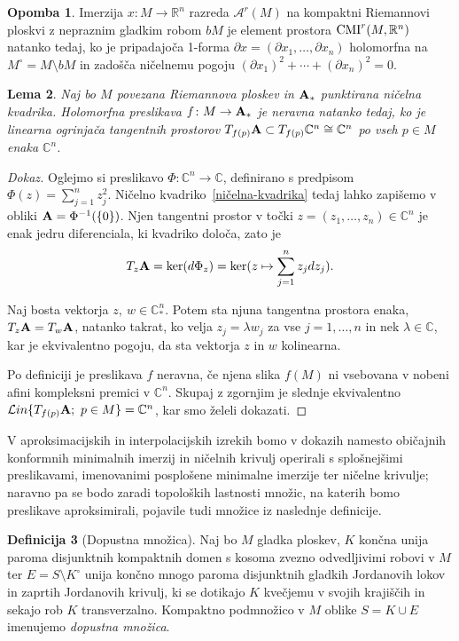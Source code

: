\documentclass[12pt,a4paper,twoside]{article}
\theoremstyle{definition} %
\newtheorem{definicija}{Definicija}[section]
\newtheorem{opomba}[definicija]{Opomba}
\newenvironment{dokaz}[1][Dokaz]{\begin{proof}[#1]}{\end{proof}}
\theoremstyle{plain} %
\newtheorem{lema}[definicija]{Lema}
\numberwithin{equation}{section}  %
\newcommand{\R}{\mathbb R}
\newcommand{\C}{\mathbb C}
\begin{document}
\begin{opomba}
Imerzija $x \colon M \to \mathbb{R}^{n}$ razreda $\mathcal{A}^{r}(M)$ na kompaktni Riemannovi ploskvi z nepraznim gladkim robom $bM$ je element prostora $\textup{CMI}^{r}(M, \R^{n})$ natanko tedaj, ko je pripadajoča 1-forma $\partial x = (\partial x_{1}, \dots , \partial x_{n})$ holomorfna na $M^{\circ} = M \setminus bM$ in zadošča ničelnemu pogoju $(\partial{x_1})^2 + \cdots + (\partial{x_n})^2 = 0$.
\end{opomba}

\begin{lema} \label{lema:neravna f}
Naj bo $M$ povezana Riemannova ploskev in $\textbf{\textup{A}}_{*}$ punktirana ničelna kvadrika.
Holomorfna preslikava $f \colon M \to \textbf{\textup{A}}_{*}$ je neravna natanko tedaj, ko je linearna ogrinjača tangentnih prostorov 
$T_{f(p)} \textbf{\textup{A}} \subset T_{f(p)} \C^{n} \cong \mathbb{C}^{n}$ po vseh $p \in M$ enaka $\C^{n}$.
\end{lema}

\begin{dokaz}
Oglejmo si preslikavo 
$\Phi \colon \C^{n} \to \C$, definirano s predpisom $\Phi(z) = \sum_{j=1}^{n} z_{j}^{2}$.
Ničelno kvadriko~\eqref{ničelna-kvadrika} tedaj lahko zapišemo v obliki $\textbf{\textup{A}} = \Phi^{-1}( \{0 \} )$.
Njen tangentni prostor v točki $z = (z_{1}, \dots , z_{n}) \in \C^{n}$ je enak jedru diferenciala, ki kvadriko določa, zato je
\[ T_{z} \textbf{\textup{A}} = \ker (d \Phi_{z}) = \ker (z \mapsto \sum_{j=1}^{n} z_{j} dz_{j}). \]

Naj bosta vektorja $z, \ w \in \C_{*}^{n}$. Potem sta njuna tangentna prostora enaka, $ T_{z} \textbf{\textup{A}} = T_{w} \textbf{\textup{A}} $, natanko takrat, ko velja $z_{j} = \lambda w_{j}$ za vse $j = 1, \dots , n$ in nek $\lambda \in \C$, kar je ekvivalentno pogoju, da sta vektorja $z$ in $w$ kolinearna.

Po definiciji je preslikava $f$ neravna, če njena slika $f(M)$ ni vsebovana v nobeni afini kompleksni premici v $\C^{n}$. Skupaj z zgornjim je slednje ekvivalentno 
$ \mathcal{L}in \{T_{f(p)} \textbf{\textup{A}} ; \ p \in M \} = \C^{n}$, kar smo želeli dokazati.
\end{dokaz}

V aproksimacijskih in interpolacijskih izrekih bomo v dokazih namesto običajnih konformnih minimalnih imerzij in ničelnih krivulj operirali s splošnejšimi preslikavami, imenovanimi posplošene minimalne imerzije ter ničelne krivulje; naravno pa se bodo zaradi topoloških lastnosti množic, na katerih bomo preslikave aproksimirali, pojavile tudi množice iz naslednje definicije.
\begin{definicija} [Dopustna množica]
Naj bo $M$ gladka ploskev, $K$ končna unija paroma disjunktnih kompaktnih domen s kosoma zvezno odvedljivimi robovi v $M$ ter $E = S \setminus K^\circ$ unija končno mnogo paroma disjunktnih gladkih Jordanovih lokov in zaprtih Jordanovih krivulj, ki se dotikajo $K$ kvečjemu v svojih krajiščih in sekajo rob $K$ transverzalno. Kompaktno podmnožico v $M$ oblike $S = K \cup E$ imenujemo \emph{dopustna množica}.
\end{definicija}
\end{document}
